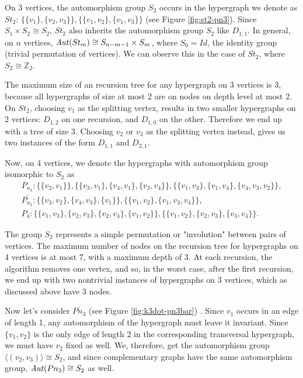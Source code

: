 On 3 vertices, the automorphism group $S_2$ occurs in the hypergraph we denote as $St_2$: $\{\{v_1\},\{v_2,v_3\}\},\{\{v_1,v_2\},\{v_1,v_3\}\}$ (see Figure \ref{fig:st2-pn3}). Since $S_1\times S_2\cong S_2$, $St_2$ also inherits the automorphism group $S_2$ like $D_{1,1}$. In general, on $n$ vertices, $\mathit{Aut}(St_m)\cong S_{n-m-1}\times S_m$, where $S_0=Id$, the identity group (trivial permutation of vertices). We can observe this in the case of $St_2$, where $S_2\cong\mathbb{Z}_2$.

The maximum size of an \FKA{} recursion tree for any hypergraph on 3 vertices is 3, because all hypergraphs of size at most 2 are on nodes on depth level at most 2. On $St_2$, choosing $v_1$ as the splitting vertex, results in two smaller hypergraphs on 2 vertices: $D_{1,2}$ on one recursion, and $D_{1,0}$ on the other. Therefore we end up with a tree of size 3. Choosing $v_2$ or $v_3$ as the splitting vertex instead, gives us two instances of the form $D_{1,1}$ and $D_{2,1}$.

Now, on 4 vertices, we denote the hypergraphs with automorphism group isomorphic to $S_2$ as
\begin{gather*}
P_{n_3}:\{\{v_2,v_1\}\},\{\{v_3,v_1\},\{v_4,v_1\},\{v_3,v_4\}\},\{\{v_1,v_3\},\{v_1,v_4\},\{v_4,v_3,v_2\}\},\\[4pt]
\overline{P_{n_3}}:\{\{v_3,v_2\},\{v_4,v_3\},\{v_1\}\},\{\{v_1,v_2\},\{v_1,v_3,v_4\}\},\\[4pt]
P_4:\{\{v_1,v_3\},\{v_2,v_3\},\{v_2,v_4\},\{v_1,v_2\}\},\{\{v_1,v_2\},\{v_2,v_3\},\{v_3,v_4\}\}.
\end{gather*}

The group $S_2$ represents a simple permutation or "involution" between pairs of vertices. The maximum number of nodes on the \FKA{} recursion tree for hypergraphs on 4 vertices is at most 7, with a maximum depth of 3. At each recursion, the algorithm removes one vertex, and so, in the worst case, after the first recursion, we end up with two nontrivial instances of hypergraphs on 3 vertices, which as discussed above have 3 nodes.

Now let's consider $\overline{Pn_3}$ (see Figure \ref{fig:k3dot-pn3bar}) . Since $v_1$ occurs in an edge of length 1, any automorphism of the hypergraph must leave it invariant. Since $\{v_1,v_2\}$ is the only edge of length 2 in the corresponding transversal hypergraph, we must have $v_2$ fixed as well. We, therefore, get the automorphism group $\langle(v_2,v_3)\rangle\cong S_2$, and since complementary graphs have the same automorphism group, $\mathit{Aut}(Pn_3)\cong S_2$ as well.

